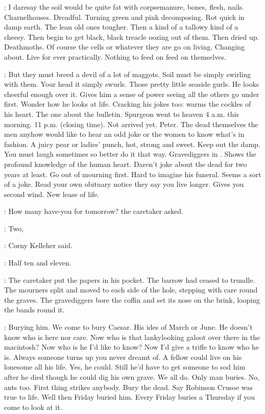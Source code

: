 \BloomInt:
I daresay the soil would be quite fat with corpsemanure, bones, flesh, nails.
Charnelhouses.
Dreadful.
Turning green and pink decomposing.
Rot quick in damp earth.
The lean old ones tougher.
Then a kind of a tallowy kind of a cheesy.
Then begin to get black, black treacle oozing out of them.
Then dried up.
Deathmoths.
Of course the cells or whatever they are go on living.
Changing about.
Live for ever practically.
Nothing to feed on
feed on themselves.

\BloomInt:
But they must breed a devil of a lot of maggots.
Soil must be simply swirling with them.
Your head it simply swurls.
Those pretty little seaside gurls.
He looks cheerful enough over it.
Gives him a sense of power seeing all the others go under first.
Wonder how he looks at life.
Cracking his jokes too:
warms the cockles of his heart.
The one about the bulletin.
Spurgeon went to heaven 4 a.m. this morning.
11 p.m. (closing time).
Not arrived yet.
Peter.
The dead themselves
the men anyhow would like to hear an odd joke
or the women to know what's in fashion.
A juicy pear or ladies' punch, hot, strong and sweet.
Keep out the damp.
You must laugh sometimes so better do it that way.
Gravediggers in .
Shows the profound knowledge of the human heart.
Daren't joke about the dead for two years at least.
Go out of mourning first.
Hard to imagine his funeral.
Seems a sort of a joke.
Read your own obituary notice they say you live longer.
Gives you second wind.
New lease of life.

\oconnell:
How many have-you for tomorrow?
the caretaker asked.

\corny:
Two,

:
Corny Kelleher said.

\corny:
Half ten and eleven.

:
The caretaker put the papers in his pocket.
The barrow had ceased to trundle.
The mourners split and moved to each side of the hole,
stepping with care round the graves.
The gravediggers bore the coffin
and set its nose on the brink,
looping the bands round it.

\BloomInt:
Burying him.
We come to bury Caesar.
His ides of March or June.
He doesn't know who is here nor care.
Now who is that lankylooking galoot over there in the macintosh?
Now who is he I'd like to know?
Now I'd give a trifle to know who he is.
Always someone turns up you never dreamt of.
A fellow could live on his lonesome all his life.
Yes, he could.
Still he'd have to get someone to sod him after he died
though he could dig his own grave.
We all do.
Only man buries.
No, ants too.
First thing strikes anybody.
Bury the dead.
Say Robinson Crusoe was true to life.
Well then Friday buried him.
Every Friday buries a Thursday if you come to look at it.


